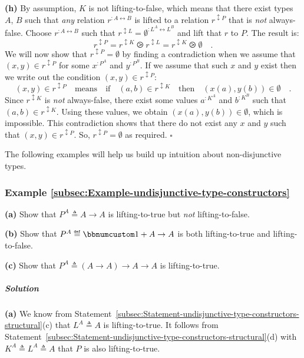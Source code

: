 \textbf{(h)} By assumption, $K$ is not lifting-to-false, which means
that there exist types $A$, $B$ such that \emph{any} relation $r^{:A\leftrightarrow B}$
is lifted to a relation $r^{\updownarrow P}$ that is \emph{not} always-false.
Choose $r^{:A\leftrightarrow B}$ such that $r^{\updownarrow L}=\emptyset^{:L^{A}\leftrightarrow L^{B}}$
and lift that $r$ to $P$. The result is:
\[
r^{\updownarrow P}=r^{\updownarrow K}\ogreaterthan r^{\updownarrow L}=r^{\updownarrow K}\ogreaterthan\emptyset\quad.
\]
We will now show that $r^{\updownarrow P}=\emptyset$ by finding a
contradiction when we assume that $(x,y)\in r^{\updownarrow P}$ for
some $x^{:P^{A}}$ and $y^{:P^{B}}$. If we assume that such $x$
and $y$ exist then we write out the condition $(x,y)\in r^{\updownarrow P}$:
\[
(x,y)\in r^{\updownarrow P}\quad\text{means}\quad\text{if}\quad(a,b)\in r^{\updownarrow K}\quad\text{then}\quad(x(a),y(b))\in\emptyset\quad.
\]
Since $r^{\updownarrow K}$ is \emph{not} always-false, there exist
some values $a^{:K^{A}}$ and $b^{:K^{B}}$ such that $(a,b)\in r^{\updownarrow K}$.
Using these values, we obtain $(x(a),y(b))\in\emptyset$, which is
impossible. This contradiction shows that there do not exist any $x$
and $y$ such that $(x,y)\in r^{\updownarrow P}$. So, $r^{\updownarrow P}=\emptyset$
as required. $\square$

The following examples will help us build up intuition about non-disjunctive
types.

\subsubsection{Example \label{subsec:Example-undisjunctive-type-constructors}\ref{subsec:Example-undisjunctive-type-constructors}}

\textbf{(a)} Show that $P^{A}\triangleq A\rightarrow A$ is lifting-to-true
but \emph{not} lifting-to-false.

\textbf{(b)} Show that $P^{A}\triangleq\bbnum 1+A\rightarrow A$ is
both lifting-to-true and lifting-to-false.

\textbf{(c)} Show that $P^{A}\triangleq\left(A\rightarrow A\right)\rightarrow A\rightarrow A$
is lifting-to-true.

\subparagraph{Solution}

\textbf{(a)} We know from Statement~\ref{subsec:Statement-undisjunctive-type-constructors-structural}(c)
that $L^{A}\triangleq A$ is lifting-to-true. It follows from Statement~\ref{subsec:Statement-undisjunctive-type-constructors-structural}(d)
with $K^{A}\triangleq L^{A}\triangleq A$ that $P$ is also lifting-to-true.

